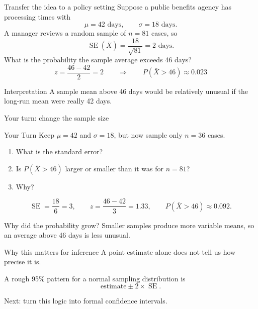 \documentclass[11pt,aspectratio=169]{beamer}
\newcommand{\yourturn}[1]{%
\begin{center}
\begin{minipage}{0.90\textwidth}
\begin{alertblock}{Your Turn}
#1
\end{alertblock}
\end{minipage}
\end{center}}
\newcommand{\SE}{\operatorname{SE}}
\begin{document}
\begin{frame}{Transfer the idea to a policy setting}
Suppose a public benefits agency has processing times with
\[
\mu=42\text{ days},\qquad \sigma=18\text{ days}.
\]
A manager reviews a random sample of $n=81$ cases, so
\[
\SE(\bar{X})=\frac{18}{\sqrt{81}}=2\text{ days}.
\]
What is the probability the sample average exceeds 46 days?
\[
z=\frac{46-42}{2}=2
\qquad\Longrightarrow\qquad
\boxed{P(\bar{X}>46)\approx0.023}
\]

\begin{alertblock}{Interpretation}
A sample mean above 46 days would be relatively unusual if the long-run mean were really 42 days.
\end{alertblock}
\end{frame}

\begin{frame}{Your turn: change the sample size}
\yourturn{Keep $\mu=42$ and $\sigma=18$, but now sample only $n=36$ cases.
\begin{enumerate}
  \item What is the standard error?
  \item Is $P(\bar{X}>46)$ larger or smaller than it was for $n=81$?
  \item Why?
\end{enumerate}}

\[
\SE=\frac{18}{6}=3,
\qquad z=\frac{46-42}{3}=1.33,
\qquad P(\bar{X}>46)\approx0.092.
\]

\begin{alertblock}{Why did the probability grow?}
Smaller samples produce more variable means, so an average above 46 days is less unusual.
\end{alertblock}
\end{frame}

\begin{frame}{Why this matters for inference}
A point estimate alone does not tell us how precise it is.

\begin{center}
\end{center}

\vspace{1em}
A rough 95\% pattern for a normal sampling distribution is
\[
\text{estimate}\pm 2\times\SE.
\]

\vfill
Next: turn this logic into formal confidence intervals.
\end{frame}
\end{document}
